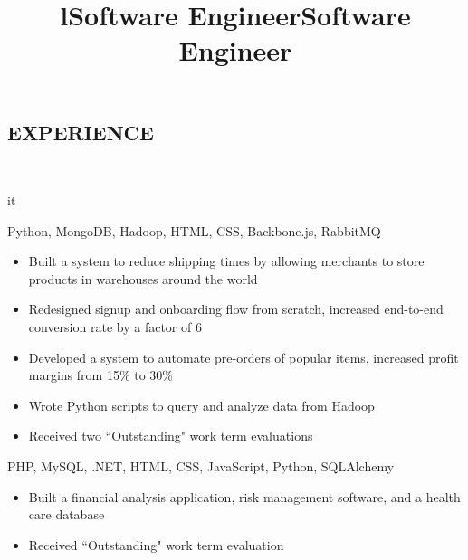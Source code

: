 \documentclass[]{res}
\begin{document}
\begin{resume}
\section{EXPERIENCE}
  \begin{format}  \\ \title{l}{it} \\ \body \end{format}
  \title{Software Engineer}
  \begin{position}
    \begin{description}
      \item Python, MongoDB, Hadoop, HTML, CSS, Backbone.js, RabbitMQ
    \end{description}
    \begin{itemize}
      \item Built a system to reduce shipping times by allowing merchants to store products in warehouses
        around the world
      \item Redesigned signup and onboarding flow from scratch, increased end-to-end conversion rate by a factor of 6
      \item Developed a system to automate pre-orders of popular items, increased profit margins from 15\% to 30\%
      \item Wrote Python scripts to query and analyze data from Hadoop
      \item Received two ``Outstanding" work term evaluations
    \end{itemize}
  \end{position}
  \title{Software Engineer}
  \begin{position}
    \begin{description}
      \item PHP, MySQL, .NET, HTML, CSS, JavaScript, Python, SQLAlchemy
    \end{description}
    \begin{itemize}
      \item Built a financial analysis application, risk management software, and a health care database
      \item Received ``Outstanding" work term evaluation
    \end{itemize}
  \end{position}


\end{resume}
\end{document}
